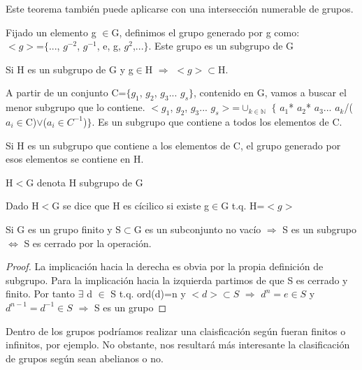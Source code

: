 \documentclass[a4paper,10pt]{apuntes}
\newenvironment{notacion}[1][Notación:]{\begin{trivlist}
\item[\hskip \labelsep {\bfseries #1}]}{\end{trivlist}}
\begin{document}
  Este teorema también puede aplicarse con una intersección numerable de grupos.
  
  \begin{defn}
   Fijado un elemento g $\in$G, definimos el grupo generado por g como:\\
   $<g>$=$\{$..., $g^{-2}$, $g^{-1}$, e, g, $g^{2}$,...$\}$. Este grupo es un subgrupo de G
  \end{defn}

  \begin{theorem}
   Si H es un subgrupo de G y g$\in$H $\Rightarrow$ $<g>\subset$H.   
  \end{theorem}

  A partir de un conjunto C=$\{g_{1}$, $g_{2}$, $g_{3}$... $g_{s}\}$, contenido en G, vamos a buscar el menor subgrupo que lo contiene.
  $<g_{1}$, $g_{2}$, $g_{3}$... $g_{s}>$=$\displaystyle \cup_{k\in\mathds{N}}$  $\{$ $a_{1}$* $a_{2}$* $a_{3}$... $a_{k}$/($a_{i}\in$C)$\vee$($a_{i}\in C^{-1}$)$\}$. Es un subgrupo que contiene a 
  todos los elementos de C.
  
  Si H es un subgrupo que contiene a los elementos de C, el grupo generado por esos elementos se contiene en H.
  
  \begin{notacion}
   H$<$G denota H subgrupo de G
  \end{notacion}
  \begin{defn}
   Dado H$<$G se dice que H es cícilico si existe g$\in$G t.q. H=$<g>$ 
  \end{defn}

  \begin{theorem}
   Si G es un grupo finito y S$\subset$G es un subconjunto no vacío $\Rightarrow$ S es un subgrupo $\Leftrightarrow$ S es cerrado por la operación.   
  \end{theorem}
  \begin{proof}
   La implicación hacia la derecha es obvia por la propia definición de subgrupo.
   Para la implicación hacia la izquierda partimos de que S es cerrado y finito. Por tanto $\exists$ d $\in$ S t.q. ord(d)=n y $<d>\subset S$
   $\Rightarrow$ $d^{n}=e\in S$ y $d^{n-1}=d^{-1}\in S$ $\Rightarrow$ S es un grupo
  \end{proof}

  Dentro de los grupos podríamos realizar una claisficación según fueran finitos o infinitos, por ejemplo. No obstante, nos resultará
  más interesante la clasificación de grupos según sean abelianos o no.
  
\end{document}
